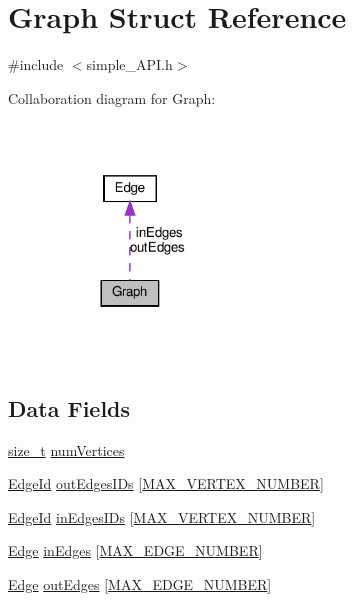 \hypertarget{structGraph}{}\section{Graph Struct Reference}
\label{structGraph}


{\ttfamily \#include $<$simple\+\_\+\+A\+P\+I.\+h$>$}



Collaboration diagram for Graph\+:
\nopagebreak
\begin{figure}[H]
\begin{center}
\leavevmode
\includegraphics[width=144pt]{d0/d3b/structGraph__coll__graph}
\end{center}
\end{figure}
\subsection*{Data Fields}
\begin{DoxyCompactItemize}
\item 
\hyperlink{tutorial__fpt__2017_2intro_2sixth_2test_8c_a7c94ea6f8948649f8d181ae55911eeaf}{size\+\_\+t} \hyperlink{structGraph_a239f350e2feccae28fe83e7bc08dd790}{num\+Vertices}
\item 
\hyperlink{first_2common_2simple__API_8h_a607d67511109aa62187da7c6e6a0167c}{Edge\+Id} \hyperlink{structGraph_add76b6fb8edce38ddb9bc705b62205e2}{out\+Edges\+I\+Ds} \mbox{[}\hyperlink{third_2common_2simple__API_8h_a79da910e27ca8262a75443fb3a4ef34b}{M\+A\+X\+\_\+\+V\+E\+R\+T\+E\+X\+\_\+\+N\+U\+M\+B\+ER}\mbox{]}
\item 
\hyperlink{first_2common_2simple__API_8h_a607d67511109aa62187da7c6e6a0167c}{Edge\+Id} \hyperlink{structGraph_affecc30a95a9a136b0ca8270a6b2ff6f}{in\+Edges\+I\+Ds} \mbox{[}\hyperlink{third_2common_2simple__API_8h_a79da910e27ca8262a75443fb3a4ef34b}{M\+A\+X\+\_\+\+V\+E\+R\+T\+E\+X\+\_\+\+N\+U\+M\+B\+ER}\mbox{]}
\item 
\hyperlink{structEdge}{Edge} \hyperlink{structGraph_a0b666804024b15dc19465a6dcbf3e4b7}{in\+Edges} \mbox{[}\hyperlink{third_2common_2simple__API_8h_a141e5a9265147f95cb059a45d16dcc10}{M\+A\+X\+\_\+\+E\+D\+G\+E\+\_\+\+N\+U\+M\+B\+ER}\mbox{]}
\item 
\hyperlink{structEdge}{Edge} \hyperlink{structGraph_af60caacc896273777695c935b9a66482}{out\+Edges} \mbox{[}\hyperlink{third_2common_2simple__API_8h_a141e5a9265147f95cb059a45d16dcc10}{M\+A\+X\+\_\+\+E\+D\+G\+E\+\_\+\+N\+U\+M\+B\+ER}\mbox{]}
\end{DoxyCompactItemize}


